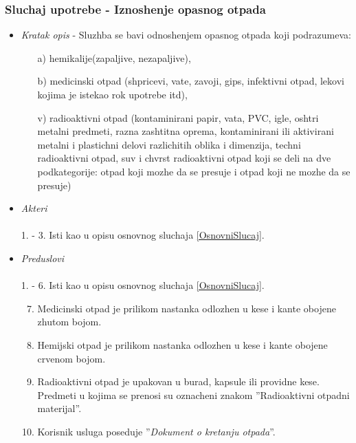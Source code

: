 \documentclass[10 pt]{article}
\begin{document}
	\subsubsection{Sluchaj upotrebe - Iznoshenje opasnog otpada}
		
		\begin{itemize}
			
			\item\textit{Kratak opis} - Sluzhba se bavi odnoshenjem opasnog otpada koji podrazumeva: 
				\begin{enumerate}
					\item[a)] hemikalije(zapaljive, nezapaljive),
					\item[b)] medicinski otpad (shpricevi, vate, zavoji, gips, infektivni otpad, lekovi kojima je istekao rok upotrebe itd),
					\item[v)] radioaktivni otpad (kontaminirani papir, vata, PVC, igle, oshtri metalni predmeti, razna zashtitna oprema, kontaminirani ili aktivirani metalni i plastichni delovi razlichitih oblika i dimenzija, techni radioaktivni otpad, suv i chvrst radioaktivni otpad koji se deli na  dve  podkategorije:
						otpad  koji  mozhe da se presuje i otpad koji ne mozhe da se presuje)
				\end{enumerate}
			
			
			\item\textit{Akteri}\\\\ 
				1. - 3. Isti kao u opisu osnovnog sluchaja \ref{OsnovniSlucaj}. 
					 
			\item\textit{Preduslovi}\\\\ 
				1. - 6. Isti kao u opisu osnovnog sluchaja \ref{OsnovniSlucaj}.
				\begin{enumerate}
					\setcounter{enumi}{6}
					\item Medicinski otpad je prilikom nastanka odlozhen u kese i kante obojene zhutom bojom.
					\item Hemijski otpad je prilikom nastanka odlozhen u kese i kante obojene crvenom bojom.
					\item Radioaktivni otpad je upakovan u burad, kapsule ili providne kese. Predmeti u kojima se prenosi su oznacheni znakom ''Radioaktivni otpadni materijal''.
					\item Korisnik usluga poseduje ''\textit{Dokument o kretanju otpada}''.
				\end{enumerate}
		

\end{itemize}
\end{document}
